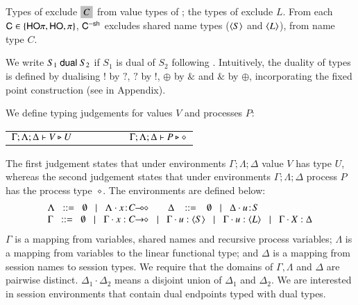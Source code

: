 Types of \HO exclude $\nonhosyntax{C}$ from 
value types of \HOp; the types of \sessp exclude $L$. 
From each $\mathsf{C} \in \{\mathsf{HO}\pi, \mathsf{HO}, \pi \}$, $\mathsf{C}^{-\mathsf{sh}}$ 
excludes shared name types ($\langle S \rangle$ and $\langle L \rangle$), 
from name type $C$.

We write $S_1 \ \mathsf{dual}\  S_2$ if 
$S_1$ is dual of $S_2$ following \cite{TGC14}.  
Intuitively, 
the duality of types is defined by 
dualising $!$ by $?$, $?$ by $!$, $\oplus$ by $\&$ and $\&$ by $\oplus$,  
incorporating the fixed point construction 
(see  in Appendix). 

\smallskip 

\noi We define typing judgements for values $V$
and processes $P$:

\begin{tabular}{c}
	$\Gamma; \Lambda; \Delta \vdash V \triangleright U \qquad \qquad \qquad \Gamma; \Lambda; \Delta \vdash P \triangleright \diamond$
\end{tabular}

\noi The first judgement
states that under environments $\Gamma; \Lambda; \Delta$ value $V$
has type $U$, whereas the second judgement states that under
environments $\Gamma; \Lambda; \Delta$ process $P$ has the process type~$\diamond$. The environments are defined below:
\[
\begin{array}{l}
 \Lambda \bnfis  \emptyset \bnfbar \Lambda \cat \AT{x}{\lhot{C}}
\quad\quad \Delta  \ \bnfis  \ \emptyset \bnfbar \Delta \cat \AT{u}{S} \\
 \Gamma  \bnfis  \emptyset \bnfbar \Gamma \cat \varp{x}: \shot{C} \bnfbar \Gamma \cat u: \chtype{S} \bnfbar \Gamma \cat u: \chtype{L} 
        \bnfbar \Gamma \cat \rvar{X}: \Delta
\end{array}
\]
\noi 
$\Gamma$ is a mapping from variables, shared names and recursive 
process variables;  $\Lambda$ is a mapping from variables to 
the linear functional type; and $\Delta$ is a mapping from 
session names to session types. 
We require that the domains of $\Gamma,
\Lambda$ and $\Delta$ are pairwise distinct. $\Delta_1\cdot \Delta_2$ means 
a disjoint union of $\Delta_1$ and $\Delta_2$.  
We are interested in session environments that contain
dual endpoints typed with dual types.

